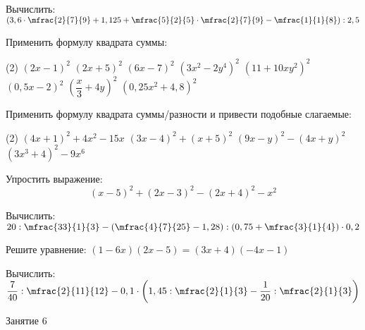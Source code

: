 \begin{class}[number=4]
	\begin{listofex}
		\item Вычислить: \( \left(  3,6 \cdot \mfrac{2}{7}{9} + 1,125 + \mfrac{5}{2}{5} \cdot  \mfrac{2}{7}{9} - \mfrac{1}{1}{8} \right) : 2,5 \)
		\item Применить формулу квадрата суммы:
		\begin{tasks}(2)
			\task \( (2x-1)^2 \)
			\task \( (2x+5)^2 \)
			\task \( (6x-7)^2 \)
			\task \( (3x^2-2y^4)^2 \)
			\task \( (11+10xy^2)^2 \)
			\task \( (0,5x-2)^2 \)
			\task \( \left( \dfrac{x}{3}+4y \right)^2 \)
			\task \( (0,25x^2+4,8)^2 \)
		\end{tasks}
		\item Применить формулу квадрата суммы/разности и привести подобные слагаемые:
		\begin{tasks}(2)
			\task \( (4x+1)^2+4x^2-15x \)
			\task \( (3x-4)^2+(x+5)^2 \)
			\task \( (9x-y)^2-(4x+y)^2 \)
			\task \( (3x^3+4)^2-9x^6 \)
		\end{tasks}
		\item Упростить выражение:
		\[ (x-5)^2+(2x-3)^2-(2x+4)^2-x^2 \]
	\end{listofex}
\end{class}

\begin{homework}[number=2]
	\begin{listofex}
		\item Вычислить: \( 20 : \mfrac{33}{1}{3} - \left( \mfrac{4}{7}{25} - 1,28 \right) : \left( 0,75 + \mfrac{3}{1}{4} \right) \cdot 0,2 \)
		\item Решите уравнение: \( (1-6x)(2x-5)=(3x+4)(-4x-1) \)
	\end{listofex}
\end{homework}

\begin{class}[number=5]
	\begin{listofex}
		\item Вычислить: \( \dfrac{7}{40} : \mfrac{2}{11}{12} - 0,1 \cdot \left( 1,45 : \mfrac{2}{1}{3} - \dfrac{1}{20} : \mfrac{2}{1}{3} \right) \)
	\end{listofex}
\end{class}

\begin{class}[number=6]
	\begin{listofex}
		\item Занятие 6
	\end{listofex}
\end{class}

